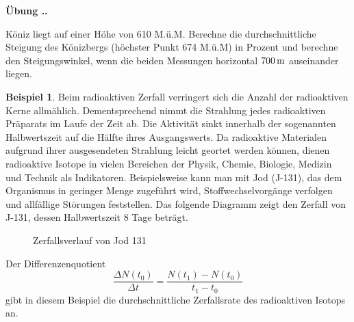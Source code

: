 \documentclass[%
<<<<<<< Updated upstream
11pt,%
twoside,%
titlepage,%
german,%
=======
11pt,%
twoside,%
titlepage,%
swissgerman,%
>>>>>>> Stashed changes
headsepline%
]{scrartcl}
\newcommand{\faEyeLightGray}{\textcolor{lightgray}{\faEye}} %
\newcommand{\definition}[1]{\colorbox{emerald}{#1}}
\theoremstyle{definition}
\newtheorem{bsp}{Beispiel}[subsection] %
\theoremstyle{plain}
\newcommand{\concatueb}[1]{ueb:#1}%
\newcommand{\concatlsg}[1]{lsg:#1}%
\newcounter{uebcounter}[section]
\renewcommand{\theuebcounter}{\thesection.\arabic{uebcounter}}  %
\newenvironment{uebenv}[1]{%
    \refstepcounter{uebcounter}
    \par\noindent\textbf{Übung \theuebcounter.}%
    \label{\concatueb{#1}}\hfill\hyperref[\concatlsg{#1}]{\faEyeLightGray}\par
}{%
    \par
}
\begin{document}
\begin{uebenv}{koenizberg}
Köniz liegt auf einer Höhe von 610 M.ü.M. Berechne die durchschnittliche Steigung des Könizbergs (höch\-ster Punkt 674 M.ü.M) in Prozent und berechne den Steigungswinkel, wenn die beiden Messungen horizontal $\unit[700]{m}$ auseinander liegen.
\end{uebenv}

\begin{bsp}\label{bspradioaktiv}
Beim radioaktiven Zerfall verringert sich die Anzahl der radioaktiven Kerne allmählich. Dementsprechend nimmt die Strahlung jedes radioaktiven Präparats im Laufe der Zeit ab. Die Aktivität sinkt innerhalb der sogenannten \definition{Halbwertszeit} auf die Hälfte ihres Ausgangswerts. Da radioaktive Materialen aufgrund ihrer ausgesendeten Strahlung leicht geortet werden können, dienen radioaktive Isotope in vielen Bereichen der Physik, Chemie, Biologie, Medizin und Technik als Indikatoren. Beispielsweise kann man mit Jod (J-131), das dem Organismus in geringer Menge zugeführt wird, Stoffwechselvorgänge verfolgen und allfällige Störungen feststellen. Das folgende Diagramm zeigt den Zerfall von J-131, dessen Halbwertszeit 8 Tage beträgt.

\begin{figure}
\begin{center}
\caption{Zerfallsverlauf von Jod 131}\label{jod}
\end{center}
\end{figure}

Der Differenzenquotient
$$\frac{\Delta N(t_0)}{\Delta t}=\frac{N(t_1)-N(t_0)}{t_1-t_0}$$
gibt in diesem Beispiel die durchschnittliche Zerfallsrate des radioaktiven Isotops an.
\end{bsp}
\end{document}
